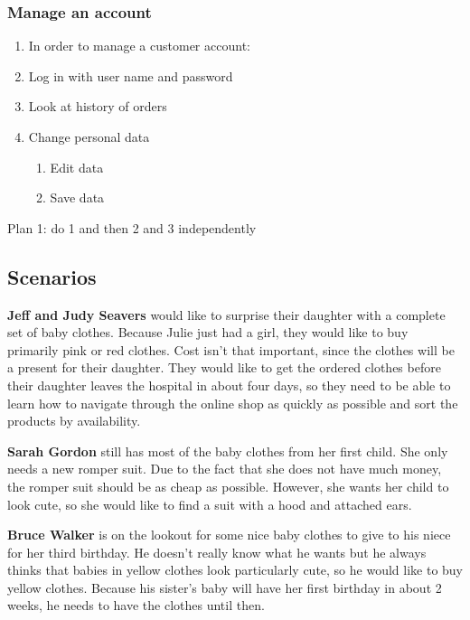 \subsubsection{Manage an account}
\begin{enumerate}[label*=\arabic*.,start=0,itemsep=-5pt]
  \item In order to manage a customer account:
  \item Log in with user name and password
  \item Look at history of orders
  \item Change personal data
    \begin{enumerate}[label*=\arabic*.,itemsep=-5pt]
      \item Edit data
      \item Save data
    \end{enumerate}
\end{enumerate}
Plan 1: do 1 and then 2 and 3 independently

\subsection{Scenarios}
\textbf{Jeff and Judy Seavers} would like to surprise their daughter with a complete set of baby clothes.
Because Julie just had a girl, they would like to buy primarily pink or red clothes. Cost isn't that important, since the clothes will be a present for their daughter.
They would like to get the ordered clothes before their daughter leaves the hospital in about four days, so they need to be able to learn how to navigate through the online shop as quickly as possible and sort the products by availability.

\textbf{Sarah Gordon} still has most of the baby clothes from her first child. She only needs a new romper suit.
Due to the fact that she does not have much money, the romper suit should be as cheap as possible.
However, she wants her child to look cute, so she would like to find a suit with a hood and attached ears.

\textbf{Bruce Walker} is on the lookout for some nice baby clothes to give to his niece for her third birthday.
He doesn't really know what he wants but he always thinks that babies in yellow clothes look particularly cute, so he would like to buy yellow clothes.
Because his sister's baby will have her first birthday in about 2 weeks, he needs to have the clothes until then.

